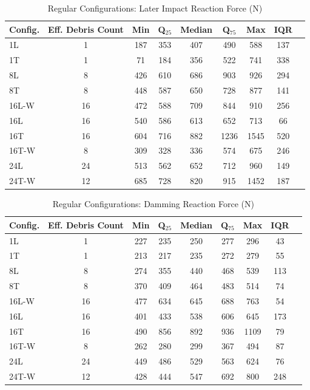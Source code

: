 \documentclass[10pt,a4paper]{article}
\begin{document}
\begin{table}[H]
\centering
\caption{Regular Configurations: Later Impact Reaction Force (N)}
\label{tab:data-reg-LI} 
\begin{tabular}{lcccccccc}
\toprule
\textbf{Config.} & \textbf{Eff. Debris Count} & \textbf{Min} & \textbf{Q$_{25}$} & \textbf{Median} & \textbf{Q$_{75}$} & \textbf{Max} & \textbf{IQR} \\
\midrule
1L   & 1  & 187 & 353 & 407 & 490 & 588 & 137 \\
1T   & 1  & 71  & 184 & 356 & 522 & 741 & 338 \\
8L   & 8  & 426 & 610 & 686 & 903 & 926 & 294 \\
8T   & 8  & 448 & 587 & 650 & 728 & 877 & 141 \\
16L-W   & 16 & 472 & 588 & 709 & 844 & 910 & 256 \\
16L & 16 & 540 & 586 & 613 & 652 & 713 & 66 \\
16T   & 16 & 604 & 716 & 882 & 1236 & 1545 & 520 \\
16T-W & 8  & 309 & 328 & 336 & 574 & 675 & 246 \\
24L   & 24 & 513 & 562 & 652 & 712 & 960 & 149 \\
24T-W & 12 & 685 & 728 & 820 & 915 & 1452 & 187 \\
\bottomrule
\end{tabular}
\end{table}

\begin{table}[H]
\centering
\caption{Regular Configurations: Damming Reaction Force (N)}
\label{tab:data-reg-DAM} 
\begin{tabular}{lcccccccc}
\toprule
\textbf{Config.} & \textbf{Eff. Debris Count} & \textbf{Min} & \textbf{Q$_{25}$} & \textbf{Median} & \textbf{Q$_{75}$} & \textbf{Max} & \textbf{IQR} \\
\midrule
1L   & 1  & 227 & 235 & 250 & 277 & 296 & 43 \\
1T   & 1  & 213 & 217 & 235 & 272 & 279 & 55 \\
8L   & 8  & 274 & 355 & 440 & 468 & 539 & 113 \\
8T   & 8  & 370 & 409 & 464 & 483 & 514 & 74 \\
16L-W   & 16 & 477 & 634 & 645 & 688 & 763 & 54 \\
16L & 16 & 401 & 433 & 538 & 606 & 645 & 173 \\
16T   & 16 & 490 & 856 & 892 & 936 & 1109 & 79 \\
16T-W & 8  & 262 & 280 & 299 & 367 & 494 & 87 \\
24L   & 24 & 449 & 486 & 529 & 563 & 624 & 76 \\
24T-W & 12 & 428 & 444 & 547 & 692 & 800 & 248 \\
\bottomrule
\end{tabular}
\end{table}
\end{document}

